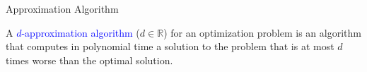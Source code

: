 \documentclass{beamer}
\theoremstyle{definition}
\def\b{\textcolor{blue}}
\begin{document}
\begin{frame}{Approximation Algorithm}
    \begin{definition}
        A \b{$d$-approximation algorithm} ($d \in \mathbb{R}$) for an optimization problem is an algorithm that computes in polynomial time a solution to the problem that is at most $d$ times worse than the optimal solution.
    \end{definition}
\end{frame}



\end{document}
